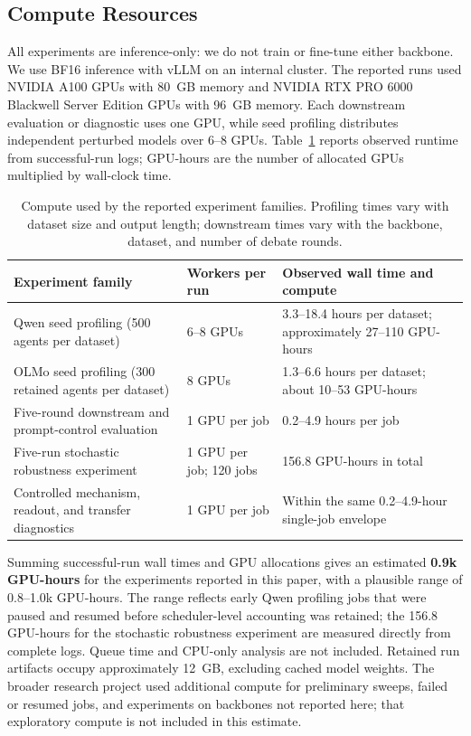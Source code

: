 \documentclass{article}
\begin{document}
\subsection{Compute Resources}
\label{app:compute_resources}

All experiments are inference-only: we do not train or fine-tune either
backbone. We use BF16 inference with vLLM on an internal cluster. The reported
runs used NVIDIA A100 GPUs with 80~GB memory and NVIDIA RTX PRO 6000 Blackwell
Server Edition GPUs with 96~GB memory. Each downstream evaluation or diagnostic
uses one GPU, while seed profiling distributes independent perturbed models
over 6--8 GPUs. Table~\ref{tab:compute_resources} reports observed runtime from
successful-run logs; GPU-hours are the number of allocated GPUs multiplied by
wall-clock time.

\begin{table}[H]
\centering
\caption{Compute used by the reported experiment families. Profiling times vary
with dataset size and output length; downstream times vary with the backbone,
dataset, and number of debate rounds.}
\label{tab:compute_resources}
\small
\begin{tabular}{p{}p{}p{}}
\toprule
Experiment family & Workers per run & Observed wall time and compute \\
\midrule
Qwen seed profiling (500 agents per dataset)
    & 6--8 GPUs
    & 3.3--18.4 hours per dataset; approximately 27--110 GPU-hours \\
OLMo seed profiling (300 retained agents per dataset)
    & 8 GPUs
    & 1.3--6.6 hours per dataset; about 10--53 GPU-hours \\
Five-round downstream and prompt-control evaluation
    & 1 GPU per job
    & 0.2--4.9 hours per job \\
Five-run stochastic robustness experiment
    & 1 GPU per job; 120 jobs
    & 156.8 GPU-hours in total \\
Controlled mechanism, readout, and transfer diagnostics
    & 1 GPU per job
    & Within the same 0.2--4.9-hour single-job envelope \\
\bottomrule
\end{tabular}
\end{table}

Summing successful-run wall times and GPU allocations gives an estimated
\textbf{0.9k GPU-hours} for the experiments reported in this paper, with a
plausible range of 0.8--1.0k GPU-hours. The range reflects early Qwen profiling
jobs that were paused and resumed before scheduler-level accounting was
retained; the 156.8 GPU-hours for the stochastic robustness experiment are
measured directly from complete logs. Queue time and CPU-only analysis are not
included. Retained run artifacts occupy approximately 12~GB, excluding cached
model weights. The broader research project used additional compute for
preliminary sweeps, failed or resumed jobs, and experiments on backbones not
reported here; that exploratory compute is not included in this estimate.
\end{document}
